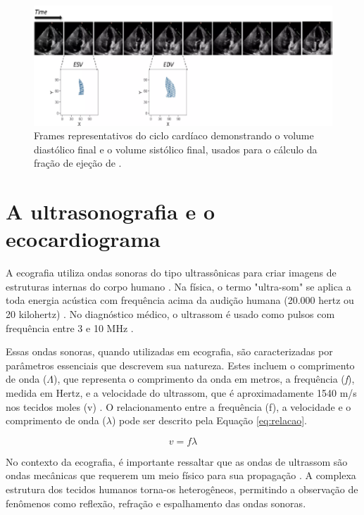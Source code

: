 \begin{figure}[H]
\centering
 \includegraphics[width=1\linewidth]{capitulos//figuras/saidadoeco.png}
\caption{Frames representativos do ciclo cardíaco demonstrando o volume diastólico final e o volume sistólico final, usados para o cálculo da fração de ejeção de \textcite{Ouyang2020}.}
\label{fig:card}
\end{figure}


\section{A ultrasonografia e o ecocardiograma}
\label{sec:A ultra sonografia e o ecocardiograma}

A ecografia utiliza ondas sonoras do tipo ultrassônicas para criar imagens de estruturas internas do corpo humano \cite{9781496321282}. Na física, o termo "ultra-som" se aplica a toda energia acústica com frequência acima da audição humana (20.000 hertz ou 20 kilohertz) \cite{Carovac2011}. No diagnóstico médico, o ultrassom é usado como pulsos com frequência entre 3 e 10 MHz \cite{velavan}.

Essas ondas sonoras, quando utilizadas em ecografia, são caracterizadas por parâmetros essenciais que descrevem sua natureza. Estes incluem o comprimento de onda ($\Lambda$), que representa o comprimento da onda em metros, a frequência (\textit{f}), medida em Hertz, e a velocidade do ultrassom, que é aproximadamente 1540 m/s nos tecidos moles (v) \cite{Carovac2011}. O relacionamento entre a frequência (f), a velocidade e o comprimento de onda ($\lambda$) pode ser descrito pela Equação \eqref{eq:relacao}.

\begin{equation}
v = f \lambda
\label{eq:relacao}
\end{equation}


No contexto da ecografia, é importante ressaltar que as ondas de ultrassom são ondas mecânicas que requerem um meio físico para sua propagação \cite{Humphrey2007}. A complexa estrutura dos tecidos humanos torna-os heterogêneos, permitindo a observação de fenômenos como reflexão, refração e espalhamento das ondas sonoras\cite{velavan}.

